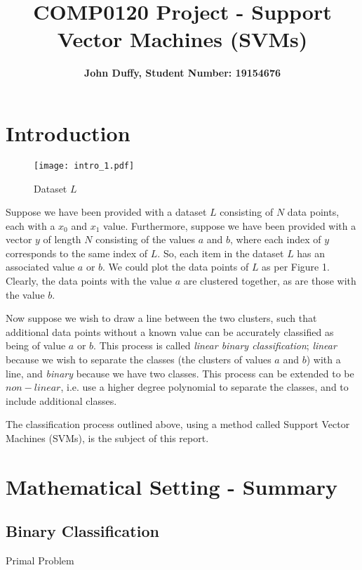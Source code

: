 \documentclass[10pt, a4paper]{amsart}
\title{COMP0120 Project - Support Vector Machines (SVM\MakeLowercase{s})}
\author{\textbf{John Duffy, Student Number: 19154676}}
\begin{document}
\maketitle

\section{Introduction}

\begin{figure}
	\centering	
	\texttt{[image: intro\_1.pdf]}
	\caption{Dataset $L$}
\end{figure}

Suppose we have been provided with a dataset $L$ consisting of $N$ data points, each with a $x_0$ and $x_1$ value. Furthermore, suppose we have been provided with a vector $y$ of length $N$ consisting of the values $a$ and $b$, where each index of $y$ corresponds to the same index of $L$. So, each item in the dataset $L$ has an associated value $a$ or $b$. We could plot the data points of $L$ as per Figure 1. Clearly, the data points with the value $a$ are clustered together, as are those with the value $b$.

Now suppose we wish to draw a line between the two clusters, such that additional data points without a known value can be accurately classified as being of value $a$ or $b$. This process is called \emph{linear binary classification}; \emph{linear} because we wish to separate the classes (the clusters of values $a$ and $b$) with a line, and \emph{binary} because we have two classes. This process can be extended to be $non-linear$, i.e. use a higher degree polynomial to separate the classes, and to include additional classes.  

The classification process outlined above, using a method called Support Vector Machines (SVMs), is the subject of this report.
\section{Mathematical Setting - Summary}

\subsection{Binary Classification}\hfill

Primal Problem


%
\end{document}
